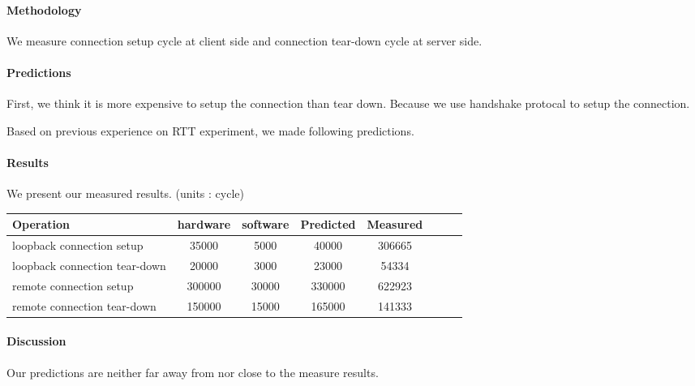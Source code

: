 \paragraph{Methodology}
We measure connection setup cycle at client side and connection tear-down cycle at server side.

\paragraph{Predictions}
First, we think it is more expensive to setup the connection than tear down. Because we use handshake protocal to setup the connection. 

Based on previous experience on RTT experiment, we made following predictions.

\paragraph{Results}
We present our measured results. (units : cycle)

\begin{center}
\begin{tabular}{l*{6}{c}r}
Operation       &  hardware & software & Predicted & Measured\\
\hline
loopback connection setup & 35000 & 5000 & 40000 & 306665 & \\
loopback connection tear-down & 20000 & 3000 & 23000 & 54334 & \\
remote connection setup & 300000  & 30000 & 330000 & 622923 &\\
remote connection tear-down & 150000  & 15000 & 165000 & 141333\\
\end{tabular}
\end{center}


\paragraph{Discussion}
Our predictions are neither far away from nor close to the measure results.
